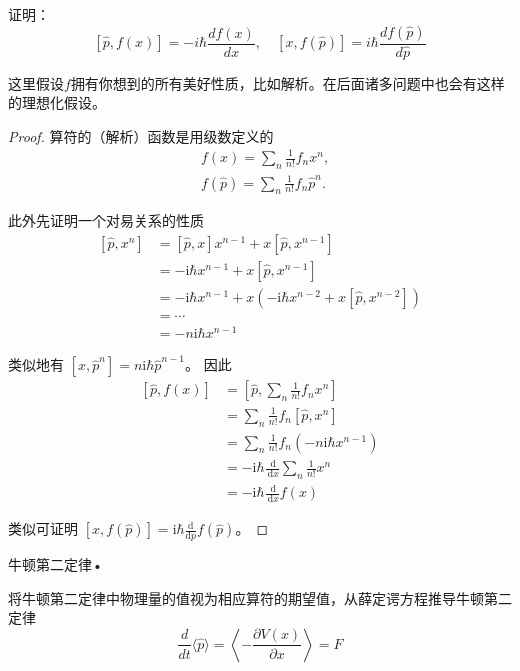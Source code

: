 \begin{2}证明：
\[[\hat{p}, f(x)]=-i \hbar \frac{d f(x)}{d x}, \quad[x, f(\hat{p})]=i \hbar \frac{d f(\hat{p})}{d \hat{p}}\]

\end{2}
\begin{remark}
这里假设$f$拥有你想到的所有美好性质，比如解析。在后面诸多问题中也会有这样的理想化假设。
\end{remark}


\begin{proof}
    算符的（解析）函数是用级数定义的
$$
\begin{aligned}
& f(x)=\sum_{n} \frac{1}{n!} f_{n} x^{n}, \\
& f(\hat{p})=\sum_{n} \frac{1}{n!} f_{n} \hat{p}^{n} .
\end{aligned}
$$

此外先证明一个对易关系的性质
$$
\begin{aligned}
{\left[\hat{p}, x^{n}\right] } & =[\hat{p}, x] x^{n-1}+x\left[\hat{p}, x^{n-1}\right] \\
& =-\mathrm{i} \hbar x^{n-1}+x\left[\hat{p}, x^{n-1}\right] \\
& =-\mathrm{i} \hbar x^{n-1}+x\left(-\mathrm{i} \hbar x^{n-2}+x\left[\hat{p}, x^{n-2}\right]\right) \\
& =\cdots \\
& =-n \mathrm{i} \hbar x^{n-1}
\end{aligned}
$$

类似地有 $\left[x, \hat{p}^{n}\right]=n \mathrm{i} \hbar \hat{p}^{n-1}$。
因此
$$
\begin{aligned}
{[\hat{p}, f(x)] } & =\left[\hat{p}, \sum_{n} \frac{1}{n!} f_{n} x^{n}\right] \\
& =\sum_{n} \frac{1}{n!} f_{n}\left[\hat{p}, x^{n}\right] \\
& =\sum_{n} \frac{1}{n!} f_{n}\left(-n \mathrm{i} \hbar x^{n-1}\right) \\
& =-\mathrm{i} \hbar \frac{\mathrm{~d}}{\mathrm{~d} x} \sum_{n} \frac{1}{n!} x^{n} \\
& =-\mathrm{i} \hbar \frac{\mathrm{~d}}{\mathrm{~d} x} f(x)
\end{aligned}
$$

类似可证明 $[\hat{x}, f(\hat{p})]=\mathrm{i} \hbar \frac{\mathrm{d}}{\mathrm{d} p} f(\hat{p})$。
\end{proof}
\begin{3}
牛顿第二定律•

将牛顿第二定律中物理量的值视为相应算符的期望值，从薛定谔方程推导牛顿第二定律
$$\frac{d}{d t}\langle\hat{p}\rangle
=\left\langle-\frac{\partial V(x)}{\partial x}\right\rangle=F$$
\end{3}
